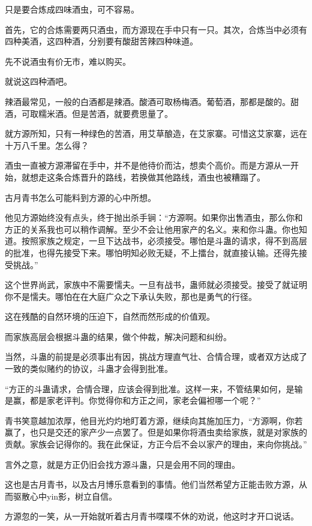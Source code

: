 \begin{this_body}
只是要合炼成四味酒虫，可不容易。

首先，它的合炼需要两只酒虫，而方源现在手中只有一只。其次，合炼当中必须有四种美酒，这四种酒，分别要有酸甜苦辣四种味道。

先不说酒虫有价无市，难以购买。

就说这四种酒吧。

辣酒最常见，一般的白酒都是辣酒。酸酒可取杨梅酒。葡萄酒，那都是酸的。甜酒，可取糯米酒。但是苦酒，就要费思量了。

就方源所知，只有一种绿色的苦酒，用艾草酿造，在艾家寨。可惜这艾家寨，远在十万八千里。怎么得？

酒虫一直被方源滞留在手中，并不是他待价而沽，想卖个高价。而是方源从一开始，就想走这条合炼晋升的路线，若换做其他路线，酒虫也被糟蹋了。

古月青书怎么可能料到方源的心中所想。

他见方源始终没有点头，终于抛出杀手锏：“方源啊。如果你出售酒虫，那么你和方正的关系我也可以稍作调解。至少不会让他用家产的名义。来和你斗蛊。你也知道。按照家族之规定，一旦下达战书，必须接受。哪怕是斗蛊的请求，得不到高层的批准，也得先接受下来。哪怕明知必败无疑，不上擂台，就直接认输。还得先接受挑战。”

这个世界尚武，家族中不需要懦夫。一旦有战书，蛊师就必须接受。接受了就证明你不是懦夫。哪怕在在大庭广众之下承认失败，那也是勇气的行径。

这在残酷的自然环境的压迫下，自然而然形成的价值观。

而家族高层会根据斗蛊的结果，做个仲裁，解决问题和纠纷。

当然，斗蛊的前提是必须事出有因，挑战方理直气壮、合情合理，或者双方达成了一致的类似赌约的协议，斗蛊才会得到批准。

“方正的斗蛊请求，合情合理，应该会得到批准。这样一来，不管结果如何，是输是赢，都是家老评判。你觉得你和方正之间，家老会偏袒哪一个呢？”

青书笑意越加浓厚，他目光灼灼地盯着方源，继续向其施加压力，“方源啊，你若赢了，也只是交还的家产少一点罢了。但是如果你将酒虫卖给家族，就是对家族的贡献。家族会记得你的。我在此保证，方正今后不会以家产的理由，来向你挑战。”

言外之意，就是方正仍旧会找方源斗蛊，只是会用不同的理由。

这也是古月青书，以及古月博乐意看到的事情。他们当然希望方正能击败方源，从而驱散心中yin影，树立自信。

方源忽的一笑，从一开始就听着古月青书喋喋不休的劝说，他这时才开口说话。


\end{this_body}
